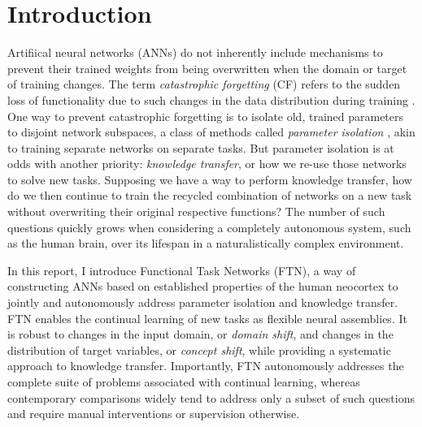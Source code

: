 \documentclass[11pt]{article}
\begin{document}
\section{Introduction}\label{sec:intro}
Artifiical neural networks (ANNs) do not inherently include mechanisms to prevent their trained weights from being overwritten when the domain or target of training changes.
The term \textit{catastrophic forgetting} (CF) refers to the sudden loss of functionality due to such changes in the data distribution during training \citep{mccloskey1989catastrophic,french1999catastrophic}.
One way to prevent catastrophic forgetting is to isolate old, trained parameters to disjoint network subspaces, a class of methods called \textit{parameter isolation} \citep{mallya2018packnet,serra2018overcoming,wortsman2020supermasks}, akin to training separate networks on separate tasks.
But parameter isolation is at odds with another priority: \textit{knowledge transfer}, or how we re-use those networks to solve new tasks.
Supposing we have a way to perform knowledge transfer, how do we then continue to train the recycled combination of networks on a new task without overwriting their original respective functions?
The number of such questions quickly grows when considering a completely autonomous system, such as the human brain, over its lifespan in a naturalistically complex environment.

In this report, I introduce Functional Task Networks (FTN), a way of constructing ANNs based on established properties of the human neocortex to jointly and autonomously address parameter isolation and knowledge transfer.
FTN enables the continual learning of new tasks as flexible neural assemblies.
It is robust to changes in the input domain, or \textit{domain shift}, and changes in the distribution of target variables, or \textit{concept shift}, while providing a systematic approach to knowledge transfer.
Importantly, FTN autonomously addresses the complete suite of problems associated with continual learning, whereas contemporary comparisons widely tend to address only a subset of such questions and require manual interventions or supervision otherwise.
\end{document}
